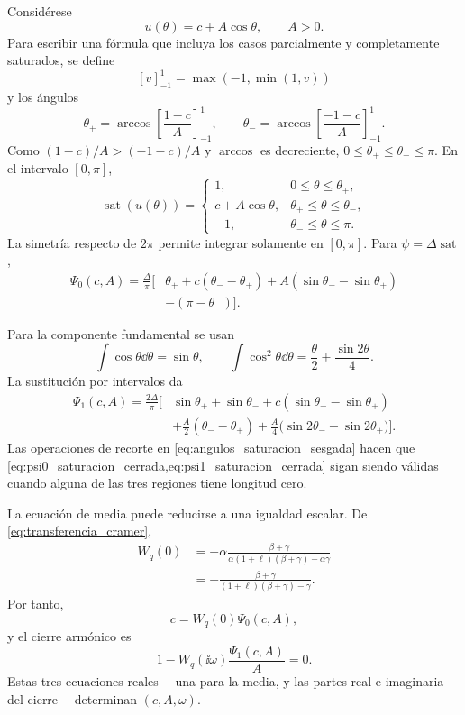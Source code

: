 Considérese
\[
u(\theta)=c+A\cos\theta,\qquad A>0.
\]
Para escribir una fórmula que incluya los casos parcialmente y completamente
saturados, se define
\[
[v]_{-1}^{1}=\max(-1,\min(1,v))
\]
y los ángulos
\begin{equation}
\theta_+
=\arccos\left[\frac{1-c}{A}\right]_{-1}^{1},
\qquad
\theta_-
=\arccos\left[\frac{-1-c}{A}\right]_{-1}^{1}.
\label{eq:angulos_saturacion_sesgada}
\end{equation}
Como \((1-c)/A>(-1-c)/A\) y \(\arccos\) es decreciente,
\(0\leq\theta_+\leq\theta_-\leq\pi\). En el intervalo
\([0,\pi]\),
\[
\operatorname{sat}(u(\theta))=
\begin{cases}
1,&0\leq\theta\leq\theta_+,\\
c+A\cos\theta,&\theta_+\leq\theta\leq\theta_-,\\
-1,&\theta_-\leq\theta\leq\pi.
\end{cases}
\]
La simetría respecto de \(2\pi\) permite integrar solamente en
\([0,\pi]\). Para \(\psi=\Delta\operatorname{sat}\),
\begin{align}
\Psi_0(c,A)
=\frac{\Delta}{\pi}\Big[
&\theta_+
+c(\theta_--\theta_+)
+A(\sin\theta_--\sin\theta_+)\nonumber\\
&-(\pi-\theta_-)
\Big].
\label{eq:psi0_saturacion_cerrada}
\end{align}

Para la componente fundamental se usan
\[
\int\cos\theta\dd\theta=\sin\theta,\qquad
\int\cos^2\theta\dd\theta
=\frac{\theta}{2}+\frac{\sin2\theta}{4}.
\]
La sustitución por intervalos da
\begin{align}
\Psi_1(c,A)
=\frac{2\Delta}{\pi}\Bigg[
&\sin\theta_++\sin\theta_-
+c(\sin\theta_--\sin\theta_+)\nonumber\\
&+\frac{A}{2}(\theta_--\theta_+)
+\frac{A}{4}
\bigl(\sin2\theta_--\sin2\theta_+\bigr)
\Bigg].
\label{eq:psi1_saturacion_cerrada}
\end{align}
Las operaciones de recorte en
\cref{eq:angulos_saturacion_sesgada} hacen que
\cref{eq:psi0_saturacion_cerrada,eq:psi1_saturacion_cerrada} sigan siendo
válidas cuando alguna de las tres regiones tiene longitud cero.

La ecuación de media puede reducirse a una igualdad escalar. De
\cref{eq:transferencia_cramer},
\begin{align}
W_q(0)
&=-\alpha
\frac{\beta+\gamma}
{\alpha(1+\ell)(\beta+\gamma)-\alpha\gamma}\nonumber\\
&=-\frac{\beta+\gamma}
{(1+\ell)(\beta+\gamma)-\gamma}.
\label{eq:ganancia_dc}
\end{align}
Por tanto,
\begin{equation}
c=W_q(0)\Psi_0(c,A),
\label{eq:cierre_dc_escalar}
\end{equation}
y el cierre armónico es
\[
1-W_q(\ii\omega)\frac{\Psi_1(c,A)}{A}=0.
\]
Estas tres ecuaciones reales ---una para la media, y las partes real e
imaginaria del cierre--- determinan \((c,A,\omega)\).


